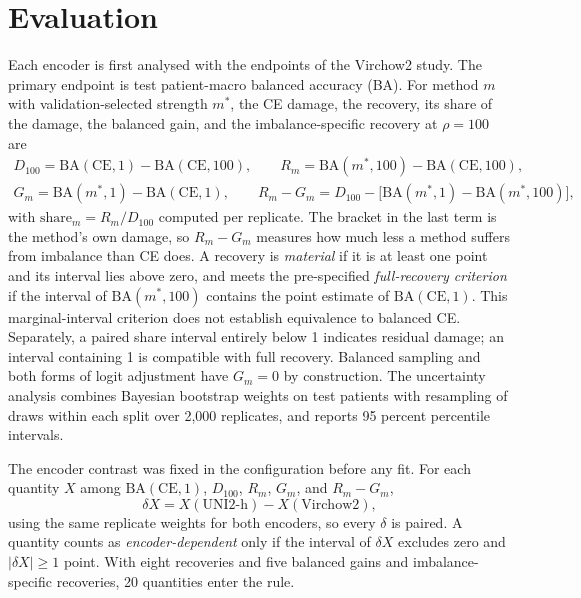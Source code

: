 \documentclass[11pt]{article}
\begin{document}
\section{Evaluation}
\label{sec:evaluation}
Each encoder is first analysed with the endpoints of the Virchow2 study. The primary endpoint is test patient-macro balanced accuracy (BA). For method $m$ with validation-selected strength $m^{*}$, the CE damage, the recovery, its share of the damage, the balanced gain, and the imbalance-specific recovery at $\rho=100$ are
\begin{equation}
  \begin{gathered}
  D_{100}=\mathrm{BA}(\mathrm{CE},1)-\mathrm{BA}(\mathrm{CE},100),\qquad
  R_m=\mathrm{BA}(m^{*},100)-\mathrm{BA}(\mathrm{CE},100),\\
  G_m=\mathrm{BA}(m^{*},1)-\mathrm{BA}(\mathrm{CE},1),\qquad
  R_m-G_m=D_{100}-\bigl[\mathrm{BA}(m^{*},1)-\mathrm{BA}(m^{*},100)\bigr],
  \end{gathered}
  \label{eq:endpoints}
\end{equation}
\noindent with $\text{share}_m=R_m/D_{100}$ computed per replicate. The bracket in the last term is the method's own damage, so $R_m-G_m$ measures how much less a method suffers from imbalance than CE does. A recovery is \emph{material} if it is at least one point and its interval lies above zero, and meets the pre-specified \emph{full-recovery criterion} if the interval of $\mathrm{BA}(m^{*},100)$ contains the point estimate of $\mathrm{BA}(\mathrm{CE},1)$. This marginal-interval criterion does not establish equivalence to balanced CE. Separately, a paired share interval entirely below 1 indicates residual damage; an interval containing 1 is compatible with full recovery. Balanced sampling and both forms of logit adjustment have $G_m=0$ by construction. The uncertainty analysis combines Bayesian bootstrap weights on test patients \citep{rubin1981bayesian} with resampling of draws within each split over 2,000 replicates, and reports 95 percent percentile intervals.

The encoder contrast was fixed in the configuration before any fit. For each quantity $X$ among $\mathrm{BA}(\mathrm{CE},1)$, $D_{100}$, $R_m$, $G_m$, and $R_m-G_m$,
\begin{equation}
  \delta X = X(\text{UNI2-h})-X(\text{Virchow2}),
  \label{eq:delta}
\end{equation}
\noindent using the same replicate weights for both encoders, so every $\delta$ is paired. A quantity counts as \emph{encoder-dependent} only if the interval of $\delta X$ excludes zero and $|\delta X|\geq1$ point. With eight recoveries and five balanced gains and imbalance-specific recoveries, 20 quantities enter the rule.
\end{document}
